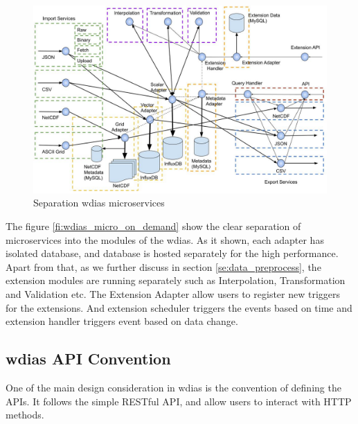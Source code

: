 \begin{figure}[htp]
    \centering
    \includegraphics[width=1\textwidth]{method/microservice/separation_microservices-v3.jpg}
    \caption{Separation \acrshort{wdias} microservices}
    \label{fi:wdias_micro_separation}
\end{figure}
The figure \ref{fi:wdias_micro_on_demand} show the clear separation of microservices into the modules of the \acrshort{wdias}. As it shown, each adapter has isolated database, and database is hosted separately for the high performance.
Apart from that, as we further discuss in section \ref{se:data_preprocess}, the extension modules are running separately such as Interpolation, Transformation and Validation etc.
The Extension Adapter allow users to register new triggers for the extensions. And extension scheduler triggers the events based on time and extension handler triggers event based on data change.


\subsection{\acrshort{wdias} API Convention}
\label{sebse:wdias_api}
One of the main design consideration in \acrshort{wdias} is the convention of defining the APIs. It follows the simple RESTful API, and allow users to interact with HTTP methods.

